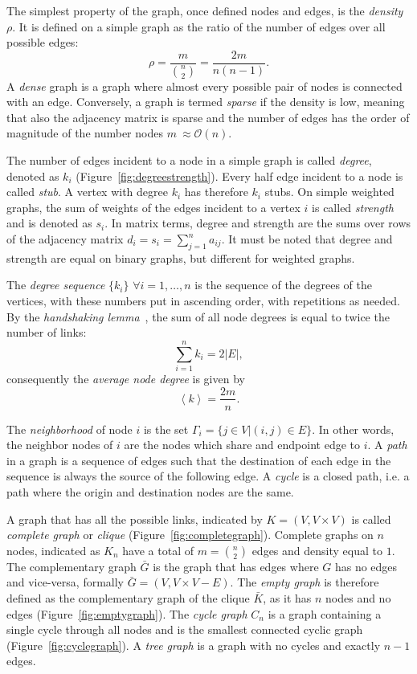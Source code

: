 The simplest property of the graph, once defined nodes and edges, is the \emph{density} $\rho$. It is defined on a simple graph as the ratio of the number of edges over all possible edges:
\begin{equation}
\rho = \frac{m}{\binom{n}{2}} = \frac{2m}{n(n-1)}.
\end{equation}
A \emph{dense} graph is a graph where almost every possible pair of nodes is connected with an edge. Conversely, a graph is termed \emph{sparse} if the density is low, meaning that also the adjacency matrix is sparse and the number of edges has the order of magnitude of the number nodes $m ~\approx \mathcal{O}(n)$.

The number of edges incident to a node in a simple graph is called \emph{degree}, denoted as $k_i$ (Figure~\ref{fig:degreestrength}). Every half edge incident to a node is called \emph{stub}. A vertex with degree $k_i$ has therefore $k_i$ stubs.
On simple weighted graphs, the sum of weights of the edges incident to a vertex $i$ is called \emph{strength} and is denoted as $s_i$. 
In matrix terms, degree and strength are the sums over rows of the adjacency matrix $d_i=s_i=\sum_{j=1}^n a_{ij}$. It must be noted that degree and strength are equal on binary graphs, but different for weighted graphs.

The \emph{degree sequence} $\{k_i\}$ $\forall i=1,\ldots,n$ is the sequence  of the degrees of the vertices, with these numbers put in ascending order, with
repetitions as needed. By the \emph{handshaking lemma}~\cite{leiserson2001}, the sum of all node degrees is equal to twice the number of links:
\begin{equation}
\label{eq:handshaking_lemma}
\sum_{i=1}^n k_i=2 |E|,
\end{equation}
consequently the \emph{average node degree} is given by
\begin{equation}
\left< k \right> = \frac{2m}{n}.
\end{equation}

The \emph{neighborhood} of node $i$ is the set $\Gamma_i=\{j \in V | (i,j) \in E \}$. In other words, the neighbor nodes of $i$ are the nodes which share and endpoint edge to $i$. 
A \emph{path} in a graph is a sequence of edges such that the destination of each edge in the sequence is always the source of the following edge. A \emph{cycle} is a closed path, i.e. a path where the origin and destination nodes are the same.

A graph that has all the possible links, indicated by $K=(V,V\times V)$ is called \emph{complete graph} or \emph{clique} (Figure~\ref{fig:completegraph}). Complete graphs on $n$ nodes, indicated as $K_n$ have a total of $m=\binom{n}{2}$ edges and density equal to $1$.
The complementary graph $\bar{G}$ is the graph that has edges where $G$ has no edges and vice-versa, formally $\bar{G}=(V,V\times V - E)$.
The \emph{empty graph} is therefore defined as the complementary graph of the clique $\bar{K}$, as it has $n$ nodes and no edges (Figure~\ref{fig:emptygraph}). The \emph{cycle graph} $C_n$ is a graph containing a single cycle through all nodes and is the smallest connected cyclic graph (Figure~\ref{fig:cyclegraph}). A \emph{tree graph} is a graph with no cycles and exactly $n-1$ edges.

